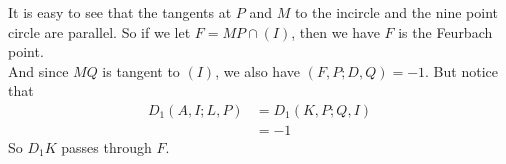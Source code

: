 
\begin{prooof}
    It is easy to see that the tangents at $P$ and $M$ to the incircle and the
    nine point circle are parallel. So if we let $F = MP\cap \left(I\right)$,
    then we have $F$ is the Feurbach point. \\

    And since $MQ$ is tangent to $(I)$, we also have $\left(F, P; D,
    Q\right)=-1$. But notice that
    \[\begin{aligned}
        D_1(A, I; L, P) &= D_1(K, P; Q, I)\\
                        &=-1
    \end{aligned}\]
    So $D_1K$ passes through $F$.
\end{prooof}
